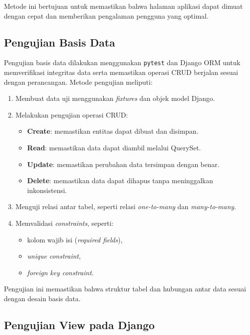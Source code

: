 Metode ini bertujuan untuk memastikan bahwa halaman aplikasi dapat dimuat dengan cepat dan memberikan pengalaman pengguna yang optimal.

\subsection{Pengujian Basis Data}

Pengujian basis data dilakukan menggunakan \texttt{pytest} dan Django ORM untuk memverifikasi integritas data serta memastikan operasi CRUD berjalan sesuai dengan perancangan. Metode pengujian meliputi:

\begin{enumerate}
    \item Membuat data uji menggunakan \textit{fixtures} dan objek model Django.
    \item Melakukan pengujian operasi CRUD:
    \begin{itemize}
        \item \textbf{Create}: memastikan entitas dapat dibuat dan disimpan.
        \item \textbf{Read}: memastikan data dapat diambil melalui QuerySet.
        \item \textbf{Update}: memastikan perubahan data tersimpan dengan benar.
        \item \textbf{Delete}: memastikan data dapat dihapus tanpa meninggalkan inkonsistensi.
    \end{itemize}
    \item Menguji relasi antar tabel, seperti relasi \textit{one-to-many} dan \textit{many-to-many}.
    \item Memvalidasi \textit{constraints}, seperti:
    \begin{itemize}
        \item kolom wajib isi (\textit{required fields}),
        \item \textit{unique constraint},
        \item \textit{foreign key constraint}.
    \end{itemize}
\end{enumerate}

Pengujian ini memastikan bahwa struktur tabel dan hubungan antar data sesuai dengan desain basis data.

\subsection{Pengujian View pada Django}

